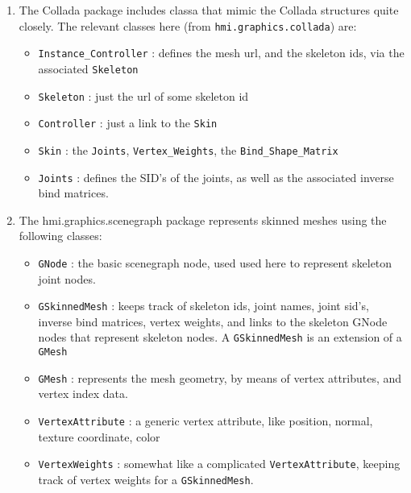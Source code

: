 \begin{enumerate}
\item The Collada package includes classa that mimic the Collada structures quite closely.
The relevant classes here (from \verb"hmi.graphics.collada") are: 
\begin{itemize}
\item \verb"Instance_Controller" : defines the mesh url, and the skeleton ids, via the associated \verb"Skeleton"
\item \verb"Skeleton" : just the url of some skeleton id
\item \verb"Controller" : just a link to the \verb"Skin"
\item \verb"Skin" : the \verb"Joints", \verb"Vertex_Weights", the \verb"Bind_Shape_Matrix"
\item \verb"Joints" : defines the SID's of the joints, as well as the associated inverse bind matrices.
\end{itemize}

\item The hmi.graphics.scenegraph package represents skinned meshes using the following classes:
\begin{itemize}
\item \verb"GNode" : the basic scenegraph node, used used here to represent skeleton joint nodes.
\item \verb"GSkinnedMesh" : keeps track of skeleton ids, joint names, joint sid's, inverse bind matrices,
vertex weights, and links to the skeleton GNode nodes that represent skeleton nodes. 
A \verb"GSkinnedMesh" is an extension of a \verb"GMesh"
\item \verb"GMesh" : represents the mesh geometry, by means of vertex attributes, and vertex index data.
\item \verb"VertexAttribute" : a generic vertex attribute, like position, normal, texture coordinate, color
\item \verb"VertexWeights" : somewhat like a complicated \verb"VertexAttribute", keeping track
of vertex weights for a \verb"GSkinnedMesh". 
\end{itemize}





\end{enumerate}
